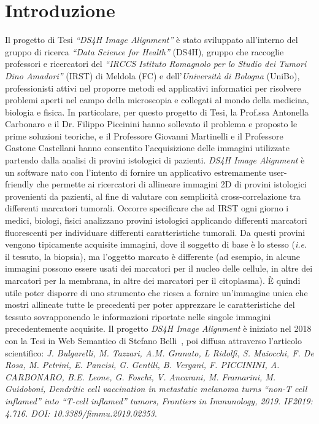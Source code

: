 \chapter*{Introduzione}
    \noindent Il progetto di Tesi \textit{``DS4H Image Alignment''} è stato sviluppato all'interno del gruppo di ricerca \textit{``Data Science for Health''} (DS4H), gruppo che raccoglie professori e ricercatori del \textit{``IRCCS Istituto Romagnolo per lo Studio dei Tumori Dino Amadori''} (IRST) di Meldola (FC) e dell'\textit{Università di Bologna} (UniBo), professionisti attivi nel proporre metodi ed applicativi informatici per risolvere problemi aperti nel campo della microscopia e collegati al mondo della medicina, biologia e fisica. In particolare, per questo progetto di Tesi, la Prof.ssa Antonella Carbonaro e il Dr. Filippo Piccinini hanno sollevato il problema e proposto le prime soluzioni teoriche, e il Professore Giovanni Martinelli e il Professore Gastone Castellani hanno consentito l’acquisizione delle immagini utilizzate partendo dalla analisi di provini istologici di pazienti.\hfill \break
    \noindent \textit{DS4H Image Alignment} è un software nato con l’intento di fornire un applicativo estremamente user-friendly che permette ai ricercatori di allineare immagini 2D di provini istologici provenienti da pazienti, al fine di valutare con semplicità cross-correlazione tra differenti marcatori tumorali. Occorre specificare che ad IRST ogni giorno i medici, biologi, fisici analizzano provini istologici applicando differenti marcatori fluorescenti per individuare differenti caratteristiche tumorali. Da questi provini vengono tipicamente acquisite immagini, dove il soggetto di base è lo stesso (\textit{i.e.} il tessuto, la biopsia), ma l’oggetto marcato è differente (ad esempio, in alcune immagini possono essere usati dei marcatori per il nucleo delle cellule, in altre dei marcatori per la membrana, in altre dei marcatori per il citoplasma). È quindi utile poter disporre di uno strumento che riesca a fornire un'immagine unica che mostri allineate tutte le precedenti per poter apprezzare le caratteristiche del tessuto sovrapponendo le informazioni riportate nelle singole immagini precedentemente acquisite.\hfill \break
    \noindent Il progetto \textit{DS4H Image Alignment} è iniziato nel 2018 con la Tesi in Web Semantico di Stefano Belli~\cite{amslaurea19123}, poi diffusa attraverso l’articolo scientifico: \textit{J. Bulgarelli, M. Tazzari, A.M. Granato, L Ridolfi, S. Maiocchi, F. De Rosa, M. Petrini, E. Pancisi, G. Gentili, B. Vergani, F. PICCININI, A. CARBONARO, B.E. Leone, G. Foschi, V. Ancarani, M. Framarini, M. Guidoboni, Dendritic cell vaccination in metastatic melanoma turns “non-T cell inflamed” into “T-cell inflamed” tumors, Frontiers in Immunology, 2019. IF2019: 4.716. DOI: 10.3389/fimmu.2019.02353}.~\cite{Bulgarelli2019-oa} \hfill \break
